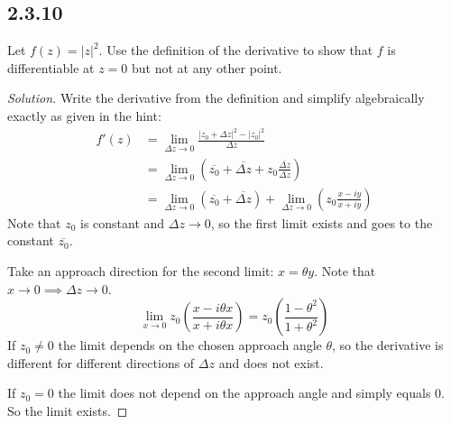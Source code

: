 \documentclass{article}
\newenvironment{solution}{
\begin{proof}[Solution]}{
\end{proof}}
\begin{document}
\subsection*{2.3.10}
Let $f(z) = |z|^2$. Use the definition of the derivative to show that $f$ is
differentiable at $z = 0$ but not at any other point.
\begin{solution}
  Write the derivative from the definition and simplify algebraically exactly as given in the hint:
  \begin{align*}
    f'(z)
    &= \lim_{\Delta z \to 0} \frac{\lvert z_0 + \Delta z \rvert^2 - \lvert z_0 \rvert^2}{\Delta z}
    \\ &= \lim_{\Delta z \to 0} \left(\overline{z_0} + \overline{\Delta z} + z_0 \frac{\overline{\Delta z}}{\Delta z}\right)
    \\ &= \lim_{\Delta z \to 0} \left(\overline{z_0} + \overline{\Delta z}\right)
       + \lim_{\Delta z \to 0} \left(z_0 \frac{x - iy}{x + iy}\right)
  \end{align*}
  Note that $z_0$ is constant and $\Delta z \to 0$, so the first limit exists and
  goes to the constant $\overline{z_0}$.

  Take an approach direction for the second limit: $x = \theta y$. Note that
  $x \to 0 \implies \Delta z \to 0$.
  \[
    \lim_{x \to 0} z_0 \left(\frac{x - i\theta x}{x + i\theta x}\right)
    = z_0 \left(\frac{1 - \theta^2}{1 + \theta^2}\right)
  \]
  If $z_0 \neq 0$ the limit depends on the chosen approach angle $\theta$, so the
  derivative is different for different directions of $\Delta z$ and does not exist.

  If $z_0 = 0$ the limit does not depend on the approach angle and simply equals $0$.
  So the limit exists.
\end{solution}
\end{document}
